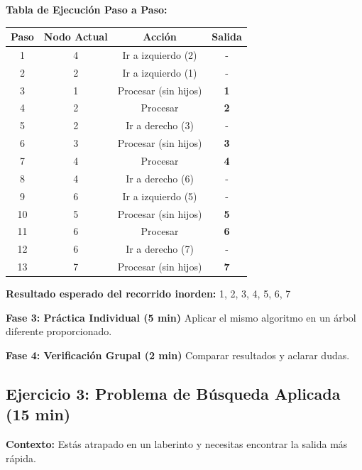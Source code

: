 \documentclass[12pt,a4paper]{article}
\begin{document}
	\textbf{Tabla de Ejecución Paso a Paso:}
	
	\begin{center}
		\begin{tabular}{|c|c|c|c|}
			\hline
			\textbf{Paso} & \textbf{Nodo Actual} & \textbf{Acción} & \textbf{Salida} \\
			\hline
			1 & 4 & Ir a izquierdo (2) & - \\
			\hline
			2 & 2 & Ir a izquierdo (1) & - \\
			\hline
			3 & 1 & Procesar (sin hijos) & \textbf{1} \\
			\hline
			4 & 2 & Procesar & \textbf{2} \\
			\hline
			5 & 2 & Ir a derecho (3) & - \\
			\hline
			6 & 3 & Procesar (sin hijos) & \textbf{3} \\
			\hline
			7 & 4 & Procesar & \textbf{4} \\
			\hline
			8 & 4 & Ir a derecho (6) & - \\
			\hline
			9 & 6 & Ir a izquierdo (5) & - \\
			\hline
			10 & 5 & Procesar (sin hijos) & \textbf{5} \\
			\hline
			11 & 6 & Procesar & \textbf{6} \\
			\hline
			12 & 6 & Ir a derecho (7) & - \\
			\hline
			13 & 7 & Procesar (sin hijos) & \textbf{7} \\
			\hline
		\end{tabular}
	\end{center}
	
	\textbf{Resultado esperado del recorrido inorden:} 1, 2, 3, 4, 5, 6, 7
	
	\textbf{Fase 3: Práctica Individual (5 min)}
	Aplicar el mismo algoritmo en un árbol diferente proporcionado.
	
	\textbf{Fase 4: Verificación Grupal (2 min)}
	Comparar resultados y aclarar dudas.
	
	\newpage
	
	\subsection*{Ejercicio 3: Problema de Búsqueda Aplicada (15 min)}
	
	
	\textbf{Contexto:} Estás atrapado en un laberinto y necesitas encontrar la salida más rápida.
	
\end{document}
